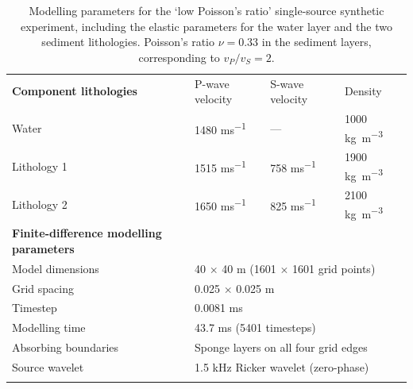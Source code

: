 \documentclass[se,manuscript]{copernicus}
\begin{document}
\begin{table}
    \caption{Modelling parameters for the `low Poisson's ratio' single-source synthetic experiment, including the elastic parameters for the water layer and the two sediment lithologies. Poisson's ratio $\nu=0.33$ in the sediment layers, corresponding to $v_P/v_S=2$.}
    \label{table:single-source-low-p-parameters}
    \begin{tabular}{llll}
        \tophline
        \textbf{Component lithologies} & P-wave velocity & S-wave velocity & Density \\
        \middlehline
        Water & 1480 \unit{ms^{-1}} & --- & 1000 \unit{kg m^{-3}} \\
        Lithology 1 & 1515 \unit{ms^{-1}} & 758 \unit{ms^{-1}} & 1900 \unit{kg m^{-3}} \\
        Lithology 2 & 1650 \unit{ms^{-1}} & 825 \unit{ms^{-1}} & 2100 \unit{kg m^{-3}} \\
        \middlehline
        \textbf{Finite-difference modelling parameters} \\
        \middlehline
        Model dimensions & \multicolumn{3}{l}{40 $\times$ 40 \unit{m} (1601 $\times$ 1601 grid points)} \\
        Grid spacing & \multicolumn{3}{l}{0.025 $\times$ 0.025 \unit{m}} \\
        Timestep & \multicolumn{3}{l}{0.0081 \unit{ms}}\\
        Modelling time & \multicolumn{3}{l}{43.7 \unit{ms} (5401 timesteps)} \\
        Absorbing boundaries & \multicolumn{3}{l}{Sponge layers on all four grid edges} \\
        Source wavelet & \multicolumn{3}{l}{1.5 \unit{kHz} Ricker wavelet (zero-phase)} \\
        \bottomhline
    \end{tabular}
\end{table}
\end{document}
